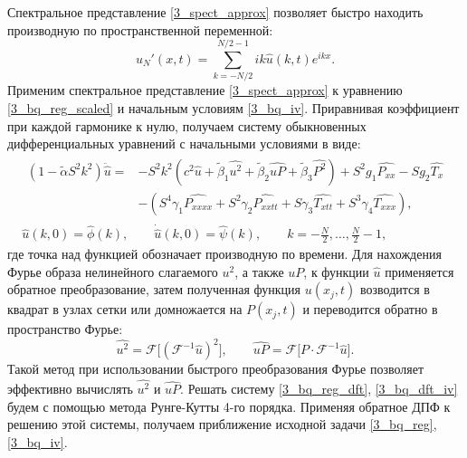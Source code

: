 \documentclass[12pt, a4paper]{report}
\newcommand{\lb}{\left (}
\newcommand{\rb}{\right )}
\begin{document}
Спектральное представление \eqref{3_spect_approx} позволяет быстро находить производную по пространственной переменной:
\begin{equation}\label{3_spect_deriv}
u_N'(x, t) = \sum_{k=-N/2}^{N/2-1} ik \widehat u(k, t) e^{ikx}.
\end{equation}
Применим спектральное представление \eqref{3_spect_approx} к уравнению \eqref{3_bq_reg_scaled} и начальным условиям \eqref{3_bq_iv}. Приравнивая коэффициент при каждой гармонике к нулю, получаем систему обыкновенных дифференциальных уравнений с начальными условиями в виде:
\begin{gather}\label{3_bq_reg_dft}
\begin{split}
\lb 1 - \tilde{\alpha} S^2 k^2\rb\ddot{\widehat u} =&  -S^2 k^2 \lb c^2 \widehat u + \tilde \beta_1 \widehat{u^2} + \tilde\beta_2\widehat{uP} + \tilde{\beta}_3\widehat{P^2} \rb + S^2 g_1 \widehat{P_{xx}} - S g_2 \widehat{T_x} \\
&- \lb S^4\gamma_1 \widehat{P_{xxxx}} + S^2\gamma_2 \widehat{P_{xxtt}} + S\gamma_3 \widehat{T_{xtt}} + S^3\gamma_4 \widehat{T_{xxx}}\rb,
\end{split}\\
\label{3_bq_dft_iv}
\widehat{u}(k, 0) = \widehat{\phi}(k), \qquad \dot{\widehat{u}}(k, 0) = \widehat{\psi}(k), \qquad k=-\frac N 2, \dots, \frac N 2 - 1,
\end{gather}
где точка над функцией обозначает производную по времени.
Для нахождения Фурье образа нелинейного слагаемого $u^2$, а также $uP$, к функции $\widehat u$ применяется обратное преобразование, затем полученная функция $u(x_j, t)$ возводится в квадрат в узлах сетки или домножается на $P(x_j, t)$ и переводится обратно в пространство Фурье:
$$
\widehat{u^2} = \mathcal{F}\lbrack\lb\mathcal{F}^{-1}\widehat u\rb^2\rbrack, \qquad \widehat{uP} = \mathcal{F}\lbrack P\cdot \mathcal{F}^{-1}\widehat u\rbrack.
$$
Такой метод при использовании быстрого преобразования Фурье позволяет эффективно вычислять $\widehat{u^2}$ и $\widehat{uP}$.
Решать систему \eqref{3_bq_reg_dft}, \eqref{3_bq_dft_iv} будем с помощью метода Рунге-Кутты 4-го порядка. Применяя обратное ДПФ к решению этой системы, получаем приближение исходной задачи \eqref{3_bq_reg}, \eqref{3_bq_iv}.
\end{document}
